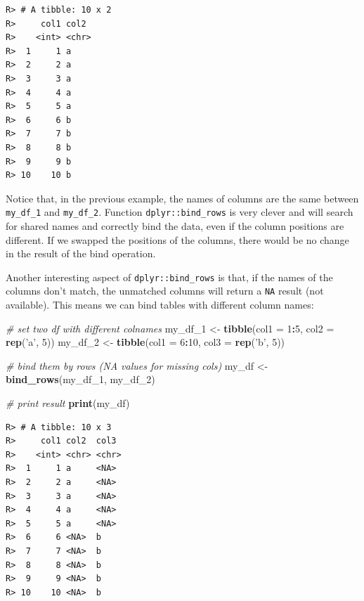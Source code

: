 \documentclass[
  12pt,
]{book}
\newenvironment{Shaded}{\begin{snugshade}}{\end{snugshade}}
\newcommand{\CommentTok}[1]{\textcolor[rgb]{0.37,0.37,0.37}{\textit{#1}}}
\newcommand{\DataTypeTok}[1]{\textcolor[rgb]{0.27,0.27,0.27}{#1}}
\newcommand{\DecValTok}[1]{\textcolor[rgb]{0.06,0.06,0.06}{#1}}
\newcommand{\KeywordTok}[1]{\textcolor[rgb]{0.27,0.27,0.27}{\textbf{#1}}}
\newcommand{\NormalTok}[1]{#1}
\newcommand{\OperatorTok}[1]{\textcolor[rgb]{0.43,0.43,0.43}{\textbf{#1}}}
\newcommand{\StringTok}[1]{\textcolor[rgb]{0.5,0.5,0.5}{#1}}
\begin{document}
\begin{verbatim}
R> # A tibble: 10 x 2
R>     col1 col2 
R>    <int> <chr>
R>  1     1 a    
R>  2     2 a    
R>  3     3 a    
R>  4     4 a    
R>  5     5 a    
R>  6     6 b    
R>  7     7 b    
R>  8     8 b    
R>  9     9 b    
R> 10    10 b
\end{verbatim}

Notice that, in the previous example, the names of columns are the same between \texttt{my\_df\_1} and \texttt{my\_df\_2}. Function \texttt{dplyr::bind\_rows} is very clever and will search for shared names and correctly bind the data, even if the column positions are different. If we swapped the positions of the columns, there would be no change in the result of the bind operation.

Another interesting aspect of \texttt{dplyr::bind\_rows} is that, if the names of the columns don't match, the unmatched columns will return a \texttt{NA} result (not available). This means we can bind tables with different column names:

\begin{Shaded}
\begin{Highlighting}[]
\CommentTok{# set two df with different colnames}
\NormalTok{my_df_}\DecValTok{1}\NormalTok{ <-}\StringTok{ }\KeywordTok{tibble}\NormalTok{(}\DataTypeTok{col1 =} \DecValTok{1}\OperatorTok{:}\DecValTok{5}\NormalTok{, }
                  \DataTypeTok{col2 =} \KeywordTok{rep}\NormalTok{(}\StringTok{'a'}\NormalTok{, }\DecValTok{5}\NormalTok{))}
\NormalTok{my_df_}\DecValTok{2}\NormalTok{ <-}\StringTok{ }\KeywordTok{tibble}\NormalTok{(}\DataTypeTok{col1 =} \DecValTok{6}\OperatorTok{:}\DecValTok{10}\NormalTok{, }
                  \DataTypeTok{col3 =} \KeywordTok{rep}\NormalTok{(}\StringTok{'b'}\NormalTok{, }\DecValTok{5}\NormalTok{))}

\CommentTok{# bind them by rows (NA values for missing cols)}
\NormalTok{my_df <-}\StringTok{ }\KeywordTok{bind_rows}\NormalTok{(my_df_}\DecValTok{1}\NormalTok{, }
\NormalTok{                   my_df_}\DecValTok{2}\NormalTok{)}

\CommentTok{# print result}
\KeywordTok{print}\NormalTok{(my_df)}
\end{Highlighting}
\end{Shaded}

\begin{verbatim}
R> # A tibble: 10 x 3
R>     col1 col2  col3 
R>    <int> <chr> <chr>
R>  1     1 a     <NA> 
R>  2     2 a     <NA> 
R>  3     3 a     <NA> 
R>  4     4 a     <NA> 
R>  5     5 a     <NA> 
R>  6     6 <NA>  b    
R>  7     7 <NA>  b    
R>  8     8 <NA>  b    
R>  9     9 <NA>  b    
R> 10    10 <NA>  b
\end{verbatim}
\end{document}
